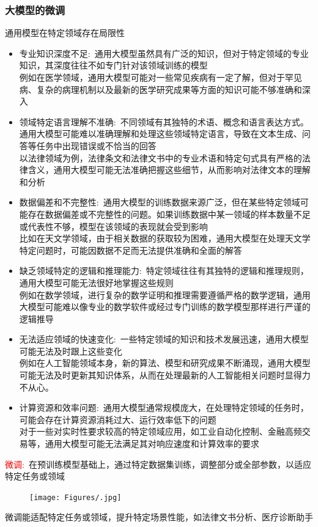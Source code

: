 \begin{frame}
    \frametitle{大模型的微调}
通用模型在特定领域存在局限性
\begin{itemize}
	\item 专业知识深度不足:~通用大模型虽然具有广泛的知识，但对于特定领域的专业知识，其深度往往不如专门针对该领域训练的模型\\
		例如在医学领域，通用大模型可能对一些常见疾病有一定了解，但对于罕见病、复杂的病理机制以及最新的医学研究成果等方面的知识可能不够准确和深入
	\item 领域特定语言理解不准确:~不同领域有其独特的术语、概念和语言表达方式。通用大模型可能难以准确理解和处理这些领域特定语言，导致在文本生成、问答等任务中出现错误或不恰当的回答\\
		以法律领域为例，法律条文和法律文书中的专业术语和特定句式具有严格的法律含义，通用大模型可能无法准确把握这些细节，从而影响对法律文本的理解和分析
	\item 数据偏差和不完整性:~通用大模型的训练数据来源广泛，但在某些特定领域可能存在数据偏差或不完整性的问题。如果训练数据中某一领域的样本数量不足或代表性不够，模型在该领域的表现就会受到影响\\
		比如在天文学领域，由于相关数据的获取较为困难，通用大模型在处理天文学特定问题时，可能因数据不足而无法提供准确和全面的解答
	\item 缺乏领域特定的逻辑和推理能力:~特定领域往往有其独特的逻辑和推理规则，通用大模型可能无法很好地掌握这些规则\\
		例如在数学领域，进行复杂的数学证明和推理需要遵循严格的数学逻辑，通用大模型可能难以像专业的数学软件或经过专门训练的数学模型那样进行严谨的逻辑推导
	\item 无法适应领域的快速变化:~一些特定领域的知识和技术发展迅速，通用大模型可能无法及时跟上这些变化\\
		例如在人工智能领域本身，新的算法、模型和研究成果不断涌现，通用大模型可能无法及时更新其知识体系，从而在处理最新的人工智能相关问题时显得力不从心。
	\item 计算资源和效率问题:~通用大模型通常规模庞大，在处理特定领域的任务时，可能会存在计算资源消耗过大、运行效率低下的问题\\
		对于一些对实时性要求较高的特定领域应用，如工业自动化控制、金融高频交易等，通用大模型可能无法满足其对响应速度和计算效率的要求
\end{itemize}
\textcolor{red}{微调:}~在预训练模型基础上，通过特定数据集训练，调整部分或全部参数，以适应特定任务或领域
\begin{figure}[h!]
\vspace*{-0.05in}
\centering
\texttt{[image: Figures/.jpg]}
\label{LLM_model-fine_tuning}
\end{figure}
         微调能适配特定任务或领域，提升特定场景性能，如法律文书分析、医疗诊断助手
\end{frame}

